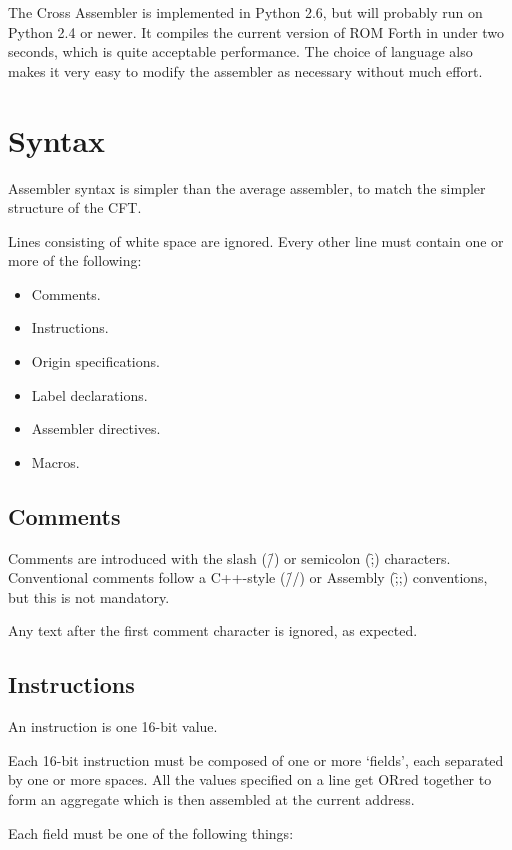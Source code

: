 The Cross Assembler is implemented in Python 2.6, but will probably run on
Python 2.4 or newer. It compiles the current version of ROM Forth in under two
seconds, which is quite acceptable performance. The choice of language also
makes it very easy to modify the assembler as necessary without much effort.

\section{Syntax}

Assembler syntax is simpler than the average assembler, to match the
simpler structure of the CFT.

Lines consisting of white space are ignored. Every other line must
contain one or more of the following:

\begin{itemize}
\item Comments.
\item Instructions.
\item Origin specifications.
\item Label declarations.
\item Assembler directives.
\item Macros.
\end{itemize}

\subsection{Comments}

Comments are introduced with the slash (\f{/}) or semicolon (\f{;})
characters. Conventional comments follow a C++-style (\f{//}) or Assembly
(\f{;;}) conventions, but this is not mandatory.

Any text after the first comment character is ignored, as expected.

\subsection{Instructions}

An instruction is one 16-bit value.

Each 16-bit instruction must be composed of one or more ‘fields’, each
separated by one or more spaces. All the values specified on a line get ORred
together to form an aggregate which is then assembled at the current address.

Each field must be one of the following things:

